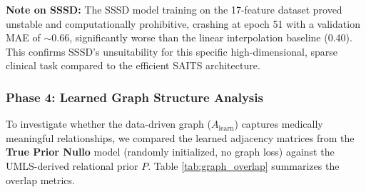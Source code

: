 \begin{table}[h]
\centering
\caption{Final Consolidated Benchmark (17 Features, Parallel Architecture)}
\label{tab:final_benchmark}
\end{table}

\textbf{Note on SSSD:} The SSSD model training on the 17-feature dataset proved unstable and computationally prohibitive, crashing at epoch 51 with a validation MAE of $\sim$0.66, significantly worse than the linear interpolation baseline (0.40). This confirms SSSD's unsuitability for this specific high-dimensional, sparse clinical task compared to the efficient SAITS architecture.

\subsubsection{Phase 4: Learned Graph Structure Analysis}
To investigate whether the data-driven graph ($A_{\text{learn}}$) captures medically meaningful relationships, we compared the learned adjacency matrices from the \textbf{True Prior Nullo} model (randomly initialized, no graph loss) against the UMLS-derived relational prior $P$. Table \ref{tab:graph_overlap} summarizes the overlap metrics.

